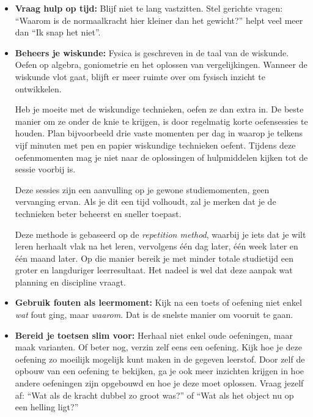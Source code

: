 {\begin{itemize}
  \item \textbf{Vraag hulp op tijd:}  
  Blijf niet te lang vastzitten. Stel gerichte vragen:  
  “Waarom is de normaalkracht hier kleiner dan het gewicht?” helpt veel meer dan “Ik snap het niet”.

  \item \textbf{Beheers je wiskunde:}  
Fysica is geschreven in de taal van de wiskunde.
Oefen op algebra, goniometrie en het oplossen van vergelijkingen.
Wanneer de wiskunde vlot gaat, blijft er meer ruimte over om fysisch inzicht te ontwikkelen.

Heb je moeite met de wiskundige technieken, oefen ze dan extra in.
De beste manier om ze onder de knie te krijgen, is door regelmatig korte oefensessies te houden.
Plan bijvoorbeeld drie vaste momenten per dag in waarop je telkens vijf minuten met pen en papier wiskundige technieken oefent.
Tijdens deze oefenmomenten mag je niet naar de oplossingen of hulpmiddelen kijken tot de sessie voorbij is.

Deze sessies zijn een aanvulling op je gewone studiemomenten, geen vervanging ervan.
Als je dit een tijd volhoudt, zal je merken dat je de technieken beter beheerst en sneller toepast.
\begin{opm}
Deze methode is gebaseerd op de \textit{repetition method}, waarbij je iets dat je wilt leren herhaalt vlak na het leren, vervolgens één dag later, één week later en één maand later.
Op die manier bereik je met minder totale studietijd een groter en langduriger leerresultaat.
Het nadeel is wel dat deze aanpak wat planning en discipline vraagt.
 \end{opm}

  \begin{marginfigure}
	\begin{center}
	\end{center}
	\vspace*{-5mm}
	\caption*{\scriptsize Link naar spaced repetition methode}
\end{marginfigure}

  \item \textbf{Gebruik fouten als leermoment:}  
  Kijk na een toets of oefening niet enkel \textit{wat} fout ging, maar \textit{waarom}.  
  Dat is de snelste manier om vooruit te gaan.

  \item \textbf{Bereid je toetsen slim voor:}  
  Herhaal niet enkel oude oefeningen, maar maak varianten. Of beter nog, verzin zelf eens een oefening. Kijk hoe je deze oefening zo moeilijk mogelijk kunt maken in de gegeven leerstof. Door zelf de opbouw van een oefening te bekijken, ga je ook meer inzichten krijgen in hoe andere oefeningen zijn opgebouwd en hoe je deze moet oplossen.
  Vraag jezelf af: “Wat als de kracht dubbel zo groot was?” of “Wat als het object nu op een helling ligt?”
\end{itemize}


}
